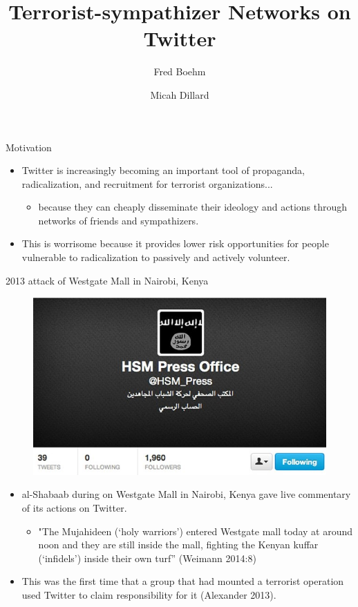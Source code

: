\documentclass{beamer}
\title{Terrorist-sympathizer Networks on Twitter}
\author
{Fred Boehm\inst{1} \and Micah Dillard\inst{2}}
\institute %
{
  \inst{1}%
  Department of Statistics\\
  University of Wisconsin--Madison
  \and
  \inst{2}%
  Department of Political Science\\
  University of Wisconsin--Madison
}
\begin{document}
\frame{\titlepage}

\begin{frame}{Motivation}
 \begin{itemize}
\item Twitter is increasingly becoming an important tool of propaganda, radicalization, and recruitment for terrorist organizations...
    \begin{itemize}
    \item  because they can cheaply disseminate their ideology and actions through \alert{networks of friends and sympathizers}.
    \end{itemize}
\item  This is worrisome because it provides lower risk opportunities for people vulnerable to radicalization to passively and actively volunteer.
\end{itemize}
 
\end{frame}


\begin{frame}{2013 attack of Westgate Mall in Nairobi, Kenya}
           \begin{figure}
            \centering
            \includegraphics[width=.4\textwidth]{picture3}
            \end{figure}
\begin{itemize}
\item al-Shabaab during  on Westgate Mall in Nairobi, Kenya gave live commentary of its actions on Twitter.
    \begin{itemize}
    \item "The Mujahideen (‘holy warriors’) entered Westgate mall today at around noon and they are still inside the mall, fighting the Kenyan kuffar (‘infidels’) inside their own turf” (Weimann 2014:8)
    \end{itemize} 
\item This was the first time that a group that had mounted a terrorist operation used Twitter to claim responsibility for it (Alexander 2013).
\end{itemize}

\end{frame}
\end{document}
